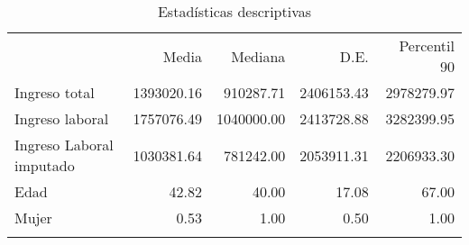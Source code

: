 \documentclass[11pt,a4paper]{article}
\begin{document}
\begin{table}[H]
    \centering
    \caption{Estadísticas descriptivas} 
    \label{tab:descriptive}
    \begingroup\fontsize{9pt}{10pt}\selectfont
    \begin{tabular}{lrrrr}
      \hline
    \addlinespace
      & Media & Mediana & D.E. & Percentil 90 \\
    \addlinespace
     \hline
     Ingreso total & 1393020.16 & 910287.71 & 2406153.43 & 2978279.97 \\ 
      Ingreso laboral & 1757076.49 & 1040000.00 & 2413728.88 & 3282399.95 \\ 
      Ingreso Laboral imputado & 1030381.64 & 781242.00 & 2053911.31 & 2206933.30 \\ 
      Edad & 42.82 & 40.00 & 17.08 & 67.00 \\ 
      Mujer & 0.53 & 1.00 & 0.50 & 1.00 \\ 
       \addlinespace
    \hline
    \addlinespace
    \end{tabular}
    \endgroup
    \end{table}




    
\end{document}
